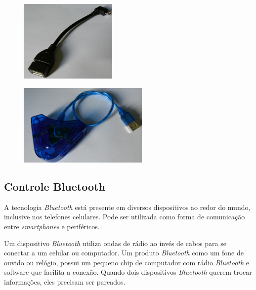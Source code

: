 \begin{figure}[H]
	
	\begin{minipage}{.5\textwidth}{
			\centering
			\includegraphics[height=4cm]{Imagens/otg.jpg}		
			\label{f.otg}	
		}
	\end{minipage}
	\begin{minipage}{.5\textwidth}{
			\centering
			\includegraphics[height=4cm]{Imagens/adaptador.jpg}		
			\label{f.adaptador}
		}
	\end{minipage}
	
\end{figure}

\subsection{Controle Bluetooth}

A tecnologia \textit{Bluetooth} está presente em diversos dispositivos ao redor do mundo, inclusive nos telefones celulares. Pode ser utilizada como forma de comunicação entre \textit{smartphones} e periféricos.

\begin{citacao}
	Um dispositivo \textit{Bluetooth} utiliza ondas de rádio ao invés de cabos para se conectar a um celular ou computador. Um produto \textit{Bluetooth} como um fone de ouvido ou relógio, possui um pequeno chip de computador com rádio \textit{Bluetooth} e software que facilita a conexão. Quando dois dispositivos \textit{Bluetooth} querem trocar informações, eles precisam ser pareados. \cite[tradução nossa]{bluetooth}
\end{citacao}

